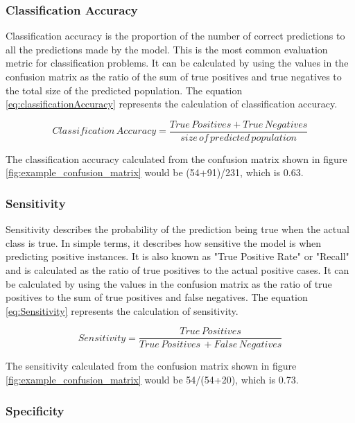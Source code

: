\documentclass[11pt,openright]{report}
\begin{document}
\subsubsection{Classification Accuracy}
Classification accuracy is the proportion of the number of correct predictions to all the predictions made by the model. This is the most common evaluation metric for classification problems. It can be calculated by using the values in the confusion matrix as the ratio of the sum of true positives and true negatives to the total size of the predicted population. The equation \ref{eq:classificationAccuracy}  represents the calculation of classification accuracy.

\begin{equation}
Classification\, Accuracy = \dfrac{True\, Positives + True\, Negatives}{size\, of\, predicted\, population} \label{eq:classificationAccuracy} 
 \end{equation}

The classification accuracy calculated from the confusion matrix shown in figure \ref{fig:example_confusion_matrix} would be (54+91)/231, which is 0.63.

\subsubsection{Sensitivity}

Sensitivity describes the probability of the prediction being true when the actual class is true. In simple terms, it describes how sensitive the model is when predicting positive instances. It is also known as "True Positive Rate" or "Recall" and is calculated as the ratio of true positives to the actual positive cases. It can be calculated by using the values in the confusion matrix as the ratio of true positives to the sum of true positives and false negatives. The equation \ref{eq:Sensitivity}  represents the calculation of sensitivity.

\begin{equation}
Sensitivity = \dfrac{True\, Positives }{True\, Positives\, + False\, Negatives} \label{eq:Sensitivity} 
 \end{equation}

The sensitivity calculated from the confusion matrix shown in figure \ref{fig:example_confusion_matrix} would be 54/(54+20), which is 0.73.


\subsubsection{Specificity}
\end{document}
